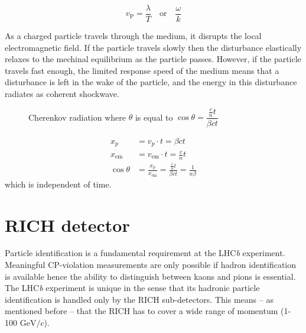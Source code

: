 \documentclass[11pt,twoside]{scrreprt}
\begin{document}
\[ v_{\text{P}} = \frac{\lambda}{T} \quad \text{or} \quad \frac{\omega}{k}\]

As a charged particle travels through the medium, it disrupts the local electromagnetic field. If the particle travels slowly then the disturbance elastically relaxes to the mechinal equilibrium as the particle passes. However, if the particle travels fast enough, the limited response speed of the medium means that a disturbance is left in the wake of the particle, and the energy in this disturbance radiates as coherent shockwave.

\begin{figure}[htbp]
  \centering
  \caption{Cherenkov radiation where $\theta$ is equal to $\cos\theta = \dfrac{\frac{c}{n}t}{\beta ct}$}
  \label{fig:label}
\end{figure}

\begin{align}
    x_p &= v_{p}\cdot t = \beta c t \nonumber \\
    x_{\text{em}} &= v_{\text{em}}\cdot t=\frac{c}{n}t \nonumber \\
    \cos\theta &= \frac{x_{\text{p}}}{x_{\text{em}}} = \frac{\frac{c}{n}t}{\beta c t} = \frac{1}{n\beta} \nonumber
\end{align}
which is independent of time.

\section{RICH detector} %
\label{sec:rich_detector}

Particle identification is a fundamental requirement at the LHC\textit{b} experiment. Meaningful CP-violation measurements are only possible if hadron identification is available hence the ability to distinguish between kaons and pions is  essential.
The LHC\textit{b} experiment is unique in the sense that its hadronic particle identification is handled only by the RICH sub-detectors. This means -- as mentioned before -- that the RICH has to cover a wide range of momentum (1-100 $\text{GeV}/c$).
\end{document}
